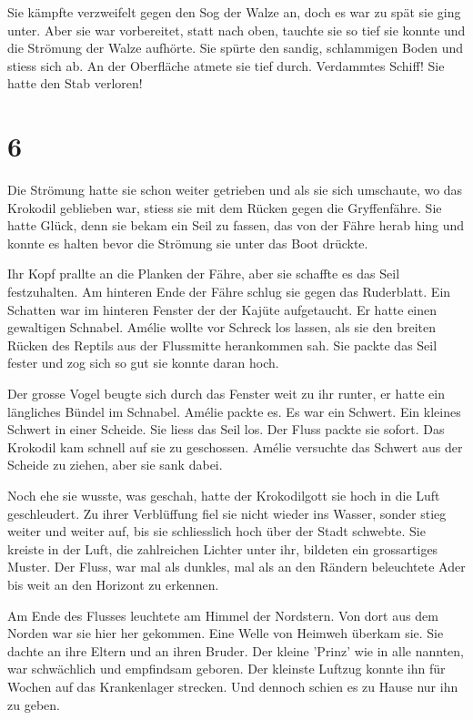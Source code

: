 \documentclass[11pt,titlepage,a5paper]{book}
\begin{document}
Sie kämpfte verzweifelt gegen den Sog der Walze an, doch es war zu spät sie ging unter. Aber sie war vorbereitet, statt nach oben, tauchte sie so tief sie konnte und die Strömung der Walze aufhörte. Sie spürte den sandig, schlammigen Boden und stiess sich ab. An der Oberfläche atmete sie tief durch. Verdammtes Schiff! Sie hatte den Stab verloren! 


\section*{6}


Die Strömung hatte sie schon weiter getrieben und als sie sich umschaute, wo das Krokodil geblieben war, stiess sie mit dem Rücken gegen die Gryffenfähre. Sie hatte Glück, denn sie bekam ein Seil zu fassen, das von der Fähre herab hing und konnte es halten bevor die Strömung sie unter das Boot drückte.

Ihr Kopf prallte an die Planken der Fähre, aber sie schaffte es das Seil festzuhalten. Am hinteren Ende der Fähre schlug sie gegen das Ruderblatt. Ein Schatten war im hinteren Fenster der der Kajüte aufgetaucht. Er hatte einen gewaltigen Schnabel. Amélie wollte vor Schreck los lassen, als sie den breiten Rücken des Reptils aus der Flussmitte herankommen sah. Sie packte das Seil fester und zog sich so gut sie konnte daran hoch.

Der grosse Vogel beugte sich durch das Fenster weit zu ihr runter, er hatte ein längliches Bündel im Schnabel. Amélie packte es. Es war ein Schwert. Ein kleines Schwert in einer Scheide. Sie liess das Seil los. Der Fluss packte sie sofort. Das Krokodil kam schnell auf sie zu geschossen. Amélie versuchte das Schwert aus der Scheide zu ziehen, aber sie sank dabei. 

Noch ehe sie wusste, was geschah, hatte der Krokodilgott sie hoch in die Luft geschleudert. Zu ihrer Verblüffung fiel sie nicht wieder ins Wasser, sonder stieg weiter und weiter auf, bis sie schliesslich hoch über der Stadt schwebte. Sie kreiste in der Luft, die zahlreichen Lichter unter ihr, bildeten ein grossartiges Muster. Der Fluss, war mal als dunkles, mal als an den Rändern beleuchtete Ader bis weit an den Horizont zu erkennen. 

Am Ende des Flusses leuchtete am Himmel der Nordstern. Von dort aus dem Norden war sie hier her gekommen. Eine Welle von Heimweh überkam sie. Sie dachte an ihre Eltern und an ihren Bruder. Der kleine 'Prinz' wie in alle nannten, war schwächlich und empfindsam geboren. Der kleinste Luftzug konnte ihn für Wochen auf das Krankenlager strecken. Und dennoch schien es zu Hause nur ihn zu geben. 
\end{document}
